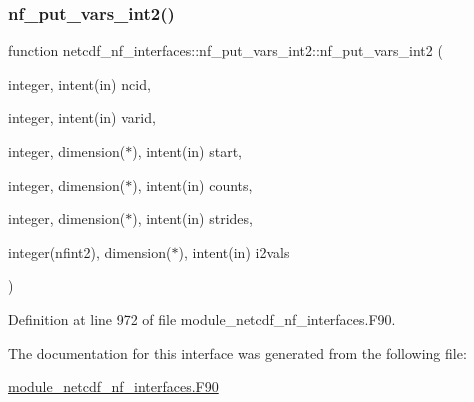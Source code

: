 \subsubsection{\texorpdfstring{nf\+\_\+put\+\_\+vars\+\_\+int2()}{nf\_put\_vars\_int2()}}
{\footnotesize\ttfamily function netcdf\+\_\+nf\+\_\+interfaces\+::nf\+\_\+put\+\_\+vars\+\_\+int2\+::nf\+\_\+put\+\_\+vars\+\_\+int2 (\begin{DoxyParamCaption}\item[{integer, intent(in)}]{ncid,  }\item[{integer, intent(in)}]{varid,  }\item[{integer, dimension($\ast$), intent(in)}]{start,  }\item[{integer, dimension($\ast$), intent(in)}]{counts,  }\item[{integer, dimension($\ast$), intent(in)}]{strides,  }\item[{integer(nfint2), dimension($\ast$), intent(in)}]{i2vals }\end{DoxyParamCaption})}



Definition at line 972 of file module\+\_\+netcdf\+\_\+nf\+\_\+interfaces.\+F90.



The documentation for this interface was generated from the following file\+:\begin{DoxyCompactItemize}
\item 
\hyperlink{module__netcdf__nf__interfaces_8F90}{module\+\_\+netcdf\+\_\+nf\+\_\+interfaces.\+F90}\end{DoxyCompactItemize}
